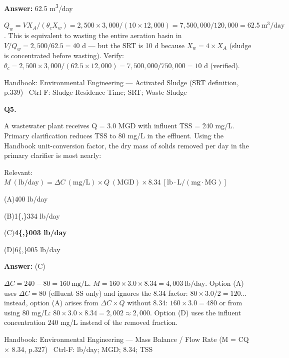 \documentclass[11pt]{article}
\newcommand{\correct}[1]{\textbf{#1}\;{\color{accent}$\checkmark$}}
\newcommand{\optline}[2]{\par\noindent\hspace{1.2em}(#1)\hspace{0.6em}#2}
\begin{document}
\vspace{2pt}\par\noindent\colorbox{boxbg}{\parbox{\dimexpr\linewidth-2\fboxsep\relax}{%
\vspace{2pt}\textbf{Answer:} 62.5 m\textsuperscript{3}/day\par\vspace{2pt}
{\small $Q_w = V X_A/(\theta_c X_w) = 2{,}500\times3{,}000/(10\times12{,}000) = 7{,}500{,}000/120{,}000 = 62.5\ \mathrm{m^3/day}$. This is equivalent to wasting the entire aeration basin in $V/Q_w = 2{,}500/62.5 = 40$ d --- but the SRT is 10 d because $X_w = 4\times X_A$ (sludge is concentrated before wasting). Verify: $\theta_c = 2{,}500\times3{,}000/(62.5\times12{,}000) = 7{,}500{,}000/750{,}000 = 10$ d (verified).}\par\vspace{2pt}
{\footnotesize\color{soft}Handbook: Environmental Engineering --- Activated Sludge (SRT definition, p.339) \textbullet\ Ctrl-F: Sludge Residence Time; SRT; Waste Sludge}\vspace{2pt}
}}
\vspace{9pt}
\filbreak
\textbf{\color{accent}Q5.}\par\vspace{2pt}
A wastewater plant receives Q = 3.0 MGD with influent TSS = 240 mg/L. Primary clarification reduces TSS to 80 mg/L in the effluent. Using the Handbook unit-conversion factor, the dry mass of solids removed per day in the primary clarifier is most nearly:\par\vspace{3pt}
{\small\color{soft}Relevant:}\ $M\ (\mathrm{lb/day}) = \Delta C\ (\mathrm{mg/L})\times Q\ (\mathrm{MGD})\times 8.34\ [\mathrm{lb\cdot L/(mg\cdot MG)}]$\par\vspace{3pt}
\optline{A}{400 lb/day}
\optline{B}{1\{,\}334 lb/day}
\optline{C}{\correct{4\{,\}003 lb/day}}
\optline{D}{6\{,\}005 lb/day}
\par\vspace{3pt}
\vspace{2pt}\par\noindent\colorbox{boxbg}{\parbox{\dimexpr\linewidth-2\fboxsep\relax}{%
\vspace{2pt}\textbf{Answer:} (C)\par\vspace{2pt}
{\small $\Delta C = 240 - 80 = 160\ \mathrm{mg/L}$.  $M = 160\times3.0\times8.34 = 4{,}003\ \mathrm{lb/day}$. Option (A) uses $\Delta C = 80$ (effluent SS only) and ignores the 8.34 factor: $80\times3.0/2 = 120$... instead, option (A) arises from $\Delta C\times Q$ without 8.34: $160\times3.0 = 480$ or from using 80 mg/L: $80\times3.0\times8.34 = 2{,}002 \approx 2{,}000$. Option (D) uses the influent concentration $240$ mg/L instead of the removed fraction.}\par\vspace{2pt}
{\footnotesize\color{soft}Handbook: Environmental Engineering --- Mass Balance / Flow Rate (M = CQ $\times$ 8.34, p.327) \textbullet\ Ctrl-F: lb/day; MGD; 8.34; TSS}\vspace{2pt}
}}
\end{document}
